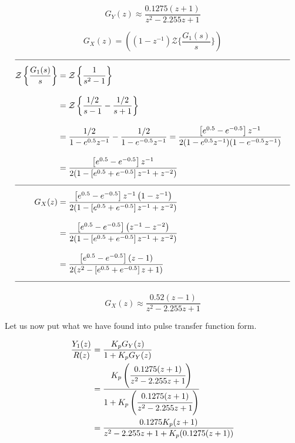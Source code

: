 \documentclass[a4paper,12pt]{article}
\begin{document}
\begin{enumerate}
\begin{enumerate}
				$$\boxed  { G_Y(z)\approx \frac{0.1275(z+1)}{z^2-2.255z+1} }$$
				
				
			\newpage
			
			$$ \boxed  { G_X(z)=\left((1-z^{-1}) \mathcal{Z}\{ \frac{G_1(s)}{s} \}\right) }$$  
			\begin{equation*}
				\begin{split}\\[-0.3cm]  \hline \\[-0.3cm] 
					\mathcal{Z}\left\{ \frac{G_1(s)}{s} \right\}&=\mathcal{Z}\left\{ \frac{1}{s^2-1} \right\} \\[0.3cm]
					&= \mathcal{Z} \left\{ \frac{1/2}{s-1}-\frac{1/2}{s+1} \right\} \\[0.3cm]
					&= \frac{1/2}{1-e^{0.5}z^{-1}} - \frac{1/2}{1-e^{-0.5}z^{-1}}  =  \frac{\left[e^{0.5}-e^{-0.5}\right] z^{-1}}{2(1-e^{0.5}z^{-1})(1-e^{-0.5}z^{-1})} \\[0.3cm]
					&=  \frac{\left[e^{0.5}-e^{-0.5}\right] z^{-1}}{2(1-\left[ e^{0.5}+e^{-0.5} \right]z^{-1}+z^{-2} )}   
					\\[0.3cm]  \hline \\[-0.3cm]
					G_X(z)&= \frac{\left[e^{0.5}-e^{-0.5}\right] z^{-1} \left(1-z^{-1} \right) }{2(1-\left[ e^{0.5}+e^{-0.5} \right]z^{-1}+z^{-2} )}   \\[0.3cm]
					&= \frac{\left[e^{0.5}-e^{-0.5}\right]  \left(z^{-1}-z^{-2} \right) }{2(1-\left[ e^{0.5}+e^{-0.5} \right]z^{-1}+z^{-2} )} \\[0.3cm]
					&= \frac{\left[e^{0.5}-e^{-0.5}\right]  \left(z-1 \right) }{2(z^2-\left[ e^{0.5}+e^{-0.5} \right]z+1 )}
					\\[0.3cm]  \hline \\[-0.3cm]
			 	\end{split} 
			\end{equation*}
			
				$$\boxed  { G_X(z)\approx \frac{0.52  \left(z-1 \right) }{z^2-2.255z+1 } }$$
				
			\newpage
			
			Let us now put what we have found into pulse transfer function form.
				
			\begin{equation*}
				\begin{split}	
					 \frac{Y_1(z)}{R(z)} &= \frac{K_p G_Y(z)}{1+K_pG_Y(z)} \\
					 & = \cfrac{K_p \left(\cfrac{0.1275(z+1)}{z^2-2.255z+1}\right)}{1+K_p\left(\cfrac{0.1275(z+1)}{z^2-2.255z+1}\right)} \\
					 & = { \frac{0.1275K_p(z+1)}{z^2-2.255z+1+K_p(0.1275(z+1))} }
				\end{split}
			\end{equation*} 
			

\end{enumerate}
\end{enumerate}
\end{document}
